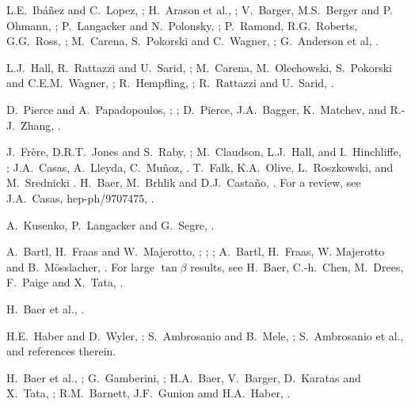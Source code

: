 \begin{thebibliography}{99}
L.E.~Ib\'a\~nez and C.~Lopez, ;
H.~Arason et al., ;
V.~Barger, M.S.~Berger and P. Ohmann, ;
P.~Langacker and N.~Polonsky, ;
P.~Ramond, R.G.~Roberts, G.G.~Ross,
;
M.~Carena, S.~Pokorski and C.~Wagner,
;
G.~Anderson et al, .

L.J.~Hall, R.~Rattazzi and U.~Sarid,
;
M.~Carena, M.~Olechowski, S.~Pokorski and
C.E.M.~Wagner, ;
R.~Hempfling, ;
R.~Rattazzi and U.~Sarid, .

D.~Pierce and A.~Papadopoulos,
;
;
D.~Pierce, J.A.~Bagger, K.~Matchev, and R.-J.~Zhang,
.

 J.~Fr\`ere, D.R.T.~Jones and S.~Raby,
; M.~Claudson, L.J.~Hall,
and I.~Hinchliffe, ;
J.A.~Casas, A.~Lleyda, C.~Mu\~noz, .
T.~Falk, K.A.~Olive, L.~Roszkowski, and M.~Srednicki
.
H.~Baer, M.~Brhlik and D.J.~Casta\~no,
. For a review,
see J.A.~Casas, hep-ph/9707475,
\perspectives.

A.~Kusenko, P.~Langacker and G.~Segre, .

  A.~Bartl, H.~Fraas and W.~Majerotto,
;
;
;
A.~Bartl, H.~Fraas, W. Majerotto and B.~M\"osslacher,
. For large $\tan\beta$ results,
see H.~Baer, C.-h.~Chen, M.~Drees, F.~Paige and X.~Tata,
.

 H.~Baer 
et al., 
.

 H.E.~Haber and D.~Wyler,
; S.~Ambrosanio and B.~Mele,
; 
S.~Ambrosanio et al.,
and references therein.

 H.~Baer 
et al., 
;
G.~Gamberini, ;
H.A.~Baer, V.~Barger, D.~Karatas and X.~Tata,
;
R.M.~Barnett, J.F.~Gunion amd H.A.~Haber, .


\end{thebibliography}
